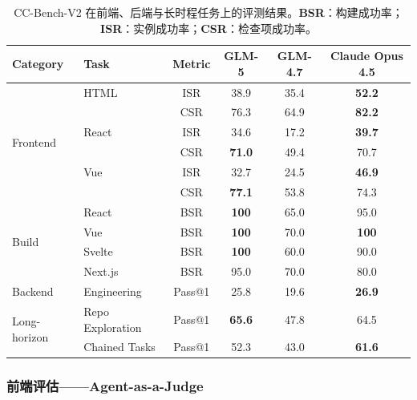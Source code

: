 \begin{table}[h!]
\centering
\caption{CC-Bench-V2 在前端、后端与长时程任务上的评测结果。\textbf{BSR}：构建成功率；\textbf{ISR}：实例成功率；\textbf{CSR}：检查项成功率。}
\label{tab:cc-bench-v2}
\begin{tabular}{llcccc}
\toprule
\textbf{Category} & \textbf{Task} & \textbf{Metric} & \textbf{GLM-5} & \textbf{GLM-4.7} & \textbf{Claude Opus 4.5} \\
\midrule
\multirow{6}{*}{Frontend}
  & HTML           & ISR     & 38.9          & 35.4          & \textbf{52.2} \\
  &                & CSR     & 76.3          & 64.9          & \textbf{82.2} \\[2pt]
  & React          & ISR     & 34.6          & 17.2          & \textbf{39.7} \\
  &                & CSR     & \textbf{71.0} & 49.4          & 70.7          \\[2pt]
  & Vue            & ISR     & 32.7          & 24.5          & \textbf{46.9} \\
  &                & CSR     & \textbf{77.1} & 53.8          & 74.3          \\
\midrule
\multirow{4}{*}{Build}
  & React          & BSR     & \textbf{100}  & 65.0          & 95.0          \\
  & Vue            & BSR     & \textbf{100}  & 70.0          & \textbf{100}  \\
  & Svelte         & BSR     & \textbf{100}  & 60.0          & 90.0          \\
  & Next.js        & BSR     & 95.0          & 70.0          & 80.0          \\
\midrule
Backend            & Engineering & Pass@1  & 25.8          & 19.6          & \textbf{26.9} \\
\midrule
\multirow{2}{*}{Long-horizon}
  & Repo Exploration   & Pass@1  & \textbf{65.6} & 47.8          & 64.5          \\
  & Chained Tasks      & Pass@1  & 52.3          & 43.0          & \textbf{61.6} \\
\bottomrule
\end{tabular}
\end{table}



\subsubsection{前端评估——Agent-as-a-Judge}

